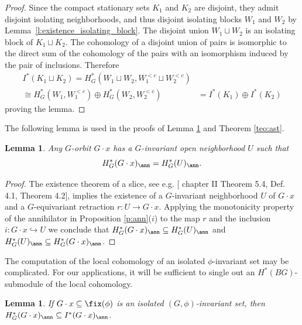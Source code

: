 \documentclass[11pt,a4paper,reqno]{article}
\numberwithin{equation}{section}
\newtheorem{lemma}[theorem]{Lemma}
\theoremstyle{definition}
\begin{document}
\begin{proof}
Since the compact stationary sets $K_1$ and $K_2$ are disjoint, they admit disjoint isolating neighborhoods, and thus disjoint isolating blocks $W_1$ and $W_2$ by  Lemma~\ref{l:existence_isolating_block}. 
The disjoint union $W_1\sqcup W_2$ is an isolating block of $K_1\sqcup K_2$.
The cohomology of a disjoint union of pairs is isomorphic to the direct sum of the cohomology of the pairs with an isomorphism induced by the pair of inclusions. 
Therefore
$$
\begin{aligned}
 I^*(K_1  \sqcup K_2)
    =
 H^*_G(W_1 \sqcup  W_2,W_1^{<c}
  \sqcup  W_2^{<c})&\\
  \cong 
 H^*_G(W_1,W_1^{<c})
 \oplus  H^*_G(W_2,W_2^{<c}) &
 =
 I^*(K_1) \oplus I^*(K_2) 
 \end{aligned}
$$
proving the lemma. 
 \qedhere
\end{proof}

The following lemma is used in 
the proofs of Lemma \ref{l:ann_orbit}
and Theorem \ref{teo:ast}.

\begin{lemma}\label{lm:cor of slice}
Any $G$-orbit $G\cdot x$ has a $G$-invariant open neighborhood $U$ such that 
\[H^*_G(G\cdot x)_\ann=H^*_G(U)_\ann.\]
\end{lemma}

\begin{proof}
The existence theorem of a slice, see e.g. \cite{Bre}[ chapter II Theorem 5.4,  Def. 4.1, Theorem 4.2], 
implies the existence of a $G$-invariant neighborhood $U$ of $G\cdot x$ and a $G$-equivariant retraction $ r:U\to G\cdot x $.
Applying the  monotonicity property of the annihilator in
Proposition \ref{p:ann}($i$)
to the map $ r $ and the inclusion $i:G\cdot x\hookrightarrow U $  
we conclude that 
$ H^*_G(G\cdot x)_\ann \subseteq H^*_G(U)_\ann$
and 
$ H^*_G(U)_\ann \subseteq H^*_G(G\cdot x)_\ann  $.
\end{proof}  

The computation of the local cohomology of an isolated 
$\phi$-invariant set 
may be complicated. 
For our applications, it will be sufficient to single out 
an $H^*(BG)$-submodule of the local cohomology.


\begin{lemma}\label{l:ann_orbit}
If $G\cdot x\subseteq \fix(\phi)$ is an isolated $(G,\phi)$-invariant set, 
then $ H^*_G(G\cdot x)_\ann \subseteq I^*(G\cdot x)_\ann $.
\end{lemma}
\end{document}
